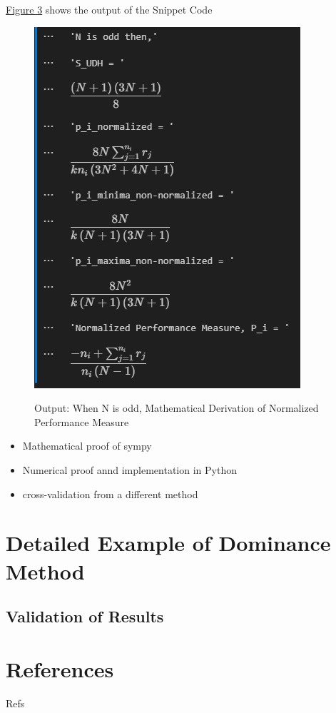 \documentclass[man,floatsintext]{apa7}
\begin{document}
\hyperref[fig:output-mathematical-validation]{Figure 3} shows the output of the Snippet Code
\begin{figure}[!htb]
	\caption{Output: When N is odd, Mathematical Derivation of Normalized Performance Measure}
	\centering
	\includegraphics [scale=1]{images/output-mathematical-validation.png}
	\label{fig:output-mathematical-validation}
\end{figure}

\begin{itemize}
    \item Mathematical proof of sympy
    \item Numerical proof annd implementation in Python 
    \item cross-validation from a different method
\end{itemize}

\section{Detailed Example of Dominance Method}

\subsection{Validation of Results}

\section{References}
Refs
\printbibliography
\appendix
\end{document}
